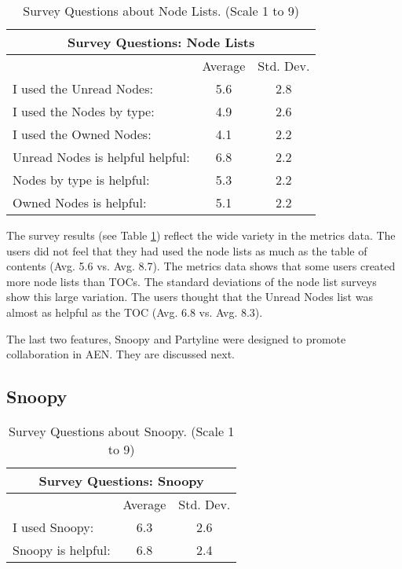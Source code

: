 \small
\begin{table}[htbp]
  \caption{Survey Questions about Node Lists. (Scale 1 to 9)}
  \begin{center}
    \begin{tabular}{|l|c|c|}
      \hline
      \multicolumn{3}{|c|}{\rule[-3mm]{0mm}{8mm}\bf Survey Questions:
      Node Lists}\\ \hline
      &Average&Std. Dev.\\ \hline
      I used the Unread Nodes:&5.6&2.8\\\hline
      I used the Nodes by type:&4.9&2.6\\\hline
      I used the Owned Nodes:&4.1&2.2\\\hline
      Unread Nodes is helpful helpful:&6.8&2.2\\\hline
      Nodes by type is helpful:&5.3&2.2\\\hline
      Owned Nodes is helpful:&5.1&2.2\\\hline
    \end{tabular}
  \end{center}
  \label{tab:survey-Nodelist}
\end{table}
\normalsize


The survey results (see Table \ref{tab:survey-Nodelist}) reflect the wide
variety in the metrics data.  The users did not feel that they had used the
node lists as much as the table of contents (Avg. 5.6 vs. Avg. 8.7).  The
metrics data shows that some users created more node lists than TOCs.  The
standard deviations of the node list surveys show this large variation.
The users thought that the Unread Nodes list was almost as helpful as the
TOC (Avg. 6.8 vs. Avg. 8.3).



The last two features, Snoopy and Partyline were designed to promote
collaboration in AEN.  They are discussed next.

\subsection{Snoopy}

\small
\begin{table}[htbp]
  \caption{Survey Questions about Snoopy. (Scale 1 to 9)}
  \begin{center}
    \begin{tabular}{|l|c|c|}
      \hline
      \multicolumn{3}{|c|}{\rule[-3mm]{0mm}{8mm}\bf Survey Questions:
      Snoopy}\\ \hline
      &Average&Std. Dev.\\ \hline
      I used Snoopy:&6.3&2.6\\\hline
      Snoopy is helpful:&6.8&2.4\\\hline
    \end{tabular}
  \end{center}
  \label{tab:survey-Snoopy}
\end{table}
\normalsize

